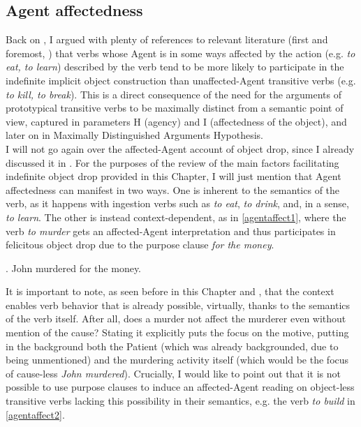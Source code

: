 \subsection{Agent affectedness} 

Back on , I argued with plenty of references to relevant literature (first and foremost, \textcite{Naess2007}) that verbs whose Agent is in some ways affected by the action (e.g. \textit{to eat, to learn}) described by the verb tend to be more likely to participate in the indefinite implicit object construction than unaffected-Agent transitive verbs (e.g. \textit{to kill, to break}). This is a direct consequence of the need for the arguments of prototypical transitive verbs to be maximally distinct from a semantic point of view, captured in  parameters H (agency) and I (affectedness of the object), and later on in  Maximally Distinguished Arguments Hypothesis.\\
I will not go again over the affected-Agent account of object drop, since I already discussed it in . For the purposes of the review of the main factors facilitating indefinite object drop provided in this Chapter, I will just mention that Agent affectedness can manifest in two ways. One is inherent to the semantics of the verb, as it happens with ingestion verbs such as \textit{to eat}, \textit{to drink}, and, in a sense, \textit{to learn}. The other is instead context-dependent, as in \ref{agentaffect1}, where the verb \textit{to murder} gets an affected-Agent interpretation and thus participates in felicitous object drop due to the purpose clause \textit{for the money}.

\ex. \label{agentaffect1} John murdered for the money. \hfill \parencite[136]{Naess2007}

It is important to note, as seen before in this Chapter and , that the context enables verb behavior that is already possible, virtually, thanks to the semantics of the verb itself. After all, does a murder not affect the murderer even without mention of the cause? Stating it explicitly puts the focus on the motive, putting in the background both the Patient (which was already backgrounded, due to being unmentioned) and the murdering activity itself (which would be the focus of cause-less \textit{John murdered}). Crucially, I would like to point out that it is not possible to use purpose clauses to induce an affected-Agent reading on object-less transitive verbs lacking this possibility in their semantics, e.g. the verb \textit{to build} in \ref{agentaffect2}.

